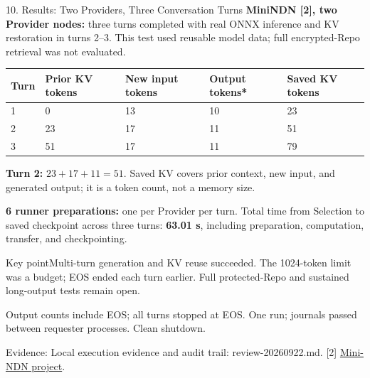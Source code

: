 \documentclass[10pt,aspectratio=169]{beamer}
\newcommand{\src}[1]{\vfill{\fontsize{6.5}{8}\selectfont\color{Gray}Evidence: #1\par}}
\newcommand{\point}[1]{\begin{block}{Key point}\small #1\end{block}}
\begin{document}
\begin{frame}{10. Results: Two Providers, Three Conversation Turns}
\small \textbf{MiniNDN [2], two Provider nodes:} three turns completed with real ONNX inference and KV restoration in turns 2--3. This test used reusable model data; full encrypted-Repo retrieval was not evaluated.
\medskip
\renewcommand{\arraystretch}{1.05}
\noindent\begin{tabularx}{.985\linewidth}{@{}p{9mm}YYYY@{}}
\toprule\textbf{Turn}&\textbf{Prior KV tokens}&\textbf{New input tokens}&\textbf{Output tokens*}&\textbf{Saved KV tokens}\\&0&13&10&23\\
2&23&17&11&51\\
3&51&17&11&79\\\bottomrule
\end{tabularx}
\medskip
\small \textbf{Turn 2:} $23 + 17 + 11 = 51$. Saved KV covers prior context, new input, and generated output; it is a token count, not a memory size.
\medskip

\small \textbf{6 runner preparations:} one per Provider per turn. Total time from Selection to saved checkpoint across three turns: \textbf{63.01 s}, including preparation, computation, transfer, and checkpointing.
\point{Multi-turn generation and KV reuse succeeded. The 1024-token limit was a budget; EOS ended each turn earlier. Full protected-Repo and sustained long-output tests remain open.}
{\scriptsize *Output counts include EOS; all turns stopped at EOS. One run; journals passed between requester processes. Clean shutdown.}
\src{Local execution evidence and audit trail: review-20260922.md. [2] \href{https://github.com/named-data/mini-ndn}{Mini-NDN project}.}
\end{frame}
\end{document}
